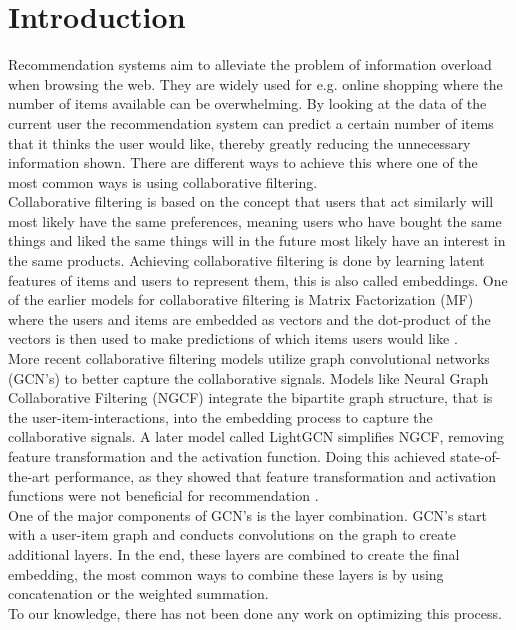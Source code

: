 \section{Introduction}
Recommendation systems aim to alleviate the problem of information overload when browsing the web.
They are widely used for e.g. online shopping where the number of items available can be overwhelming.
By looking at the data of the current user the recommendation system can predict a certain number of items that it thinks the user would like, thereby greatly reducing the unnecessary information shown.
There are different ways to achieve this where one of the most common ways is using collaborative filtering.
\\
Collaborative filtering is based on the concept that users that act similarly will most likely have the same preferences, meaning users who have bought the same things and liked the same things will in the future most likely have an interest in the same products.
Achieving collaborative filtering is done by learning latent features of items and users to represent them, this is also called embeddings.
One of the earlier models for collaborative filtering is Matrix Factorization (MF) where the users and items are embedded as vectors and the dot-product of the vectors is then used to make predictions of which items users would like \cite{Matrix-factorization-techniques}.
\\
More recent collaborative filtering models utilize graph convolutional networks (GCN's) to better capture the collaborative signals.
Models like Neural Graph Collaborative Filtering (NGCF) integrate the bipartite graph structure, that is the user-item-interactions, into the embedding process to capture the collaborative signals\cite{NGCF_2019}.
A later model called LightGCN simplifies NGCF, removing feature transformation and the activation function.
Doing this achieved state-of-the-art performance, as they showed that feature transformation and activation functions were not beneficial for recommendation \cite{lightgcn}.
\\
One of the major components of GCN's is the layer combination.
GCN's start with a user-item graph and conducts convolutions on the graph to create additional layers. %
In the end, these layers are combined to create the final embedding, the most common ways to combine these layers is by using concatenation or the weighted summation.
\\
To our knowledge, there has not been done any work on optimizing this process.
